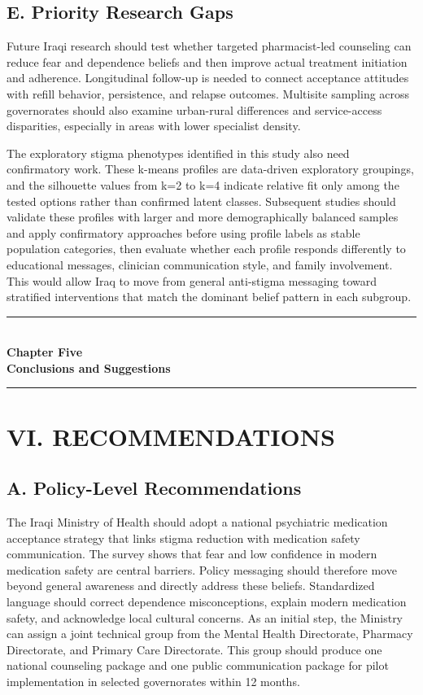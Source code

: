 \documentclass[12pt,a4paper]{article}
\begin{document}
\subsection*{E. Priority Research Gaps}
Future Iraqi research should test whether targeted pharmacist-led counseling can reduce fear and dependence beliefs and then improve actual treatment initiation and adherence. Longitudinal follow-up is needed to connect acceptance attitudes with refill behavior, persistence, and relapse outcomes. Multisite sampling across governorates should also examine urban-rural differences and service-access disparities, especially in areas with lower specialist density.

The exploratory stigma phenotypes identified in this study also need confirmatory work. These k-means profiles are data-driven exploratory groupings, and the silhouette values from k=2 to k=4 indicate relative fit only among the tested options rather than confirmed latent classes. Subsequent studies should validate these profiles with larger and more demographically balanced samples and apply confirmatory approaches before using profile labels as stable population categories, then evaluate whether each profile responds differently to educational messages, clinician communication style, and family involvement. This would allow Iraq to move from general anti-stigma messaging toward stratified interventions that match the dominant belief pattern in each subgroup.

\newpage
\newpage
\thispagestyle{plain}
\begin{center}\vspace*{0.30\textheight}
{\Large\bfseries\rule{4cm}{0.4pt}}\\[10pt]
{\Huge\bfseries Chapter Five}\\[8pt]
{\Large\bfseries Conclusions and Suggestions}\\[10pt]
{\Large\bfseries\rule{4cm}{0.4pt}}
\end{center}
\newpage
\section*{VI. RECOMMENDATIONS}
\subsection*{A. Policy-Level Recommendations}
The Iraqi Ministry of Health should adopt a national psychiatric medication acceptance strategy that links stigma reduction with medication safety communication. The survey shows that fear and low confidence in modern medication safety are central barriers. Policy messaging should therefore move beyond general awareness and directly address these beliefs. Standardized language should correct dependence misconceptions, explain modern medication safety, and acknowledge local cultural concerns. As an initial step, the Ministry can assign a joint technical group from the Mental Health Directorate, Pharmacy Directorate, and Primary Care Directorate. This group should produce one national counseling package and one public communication package for pilot implementation in selected governorates within 12 months.
\end{document}
